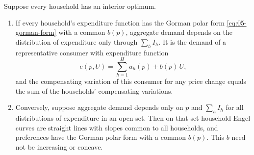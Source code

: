 \begin{proposition}\label{prop:05-gorman}
Suppose every household has an interior optimum.
\begin{enumerate}[label=(\roman*)]
  \item If every household's expenditure function has the Gorman polar form \eqref{eq:05-gorman-form}
  with a common $b(p)$, aggregate demand depends on the distribution of expenditure only through
  $\sum_h I_h$. It is the demand of a representative consumer with expenditure function
  \begin{equation}\label{eq:05-gorman-rep}
    e(p, U) = \sum_{h=1}^{H} a_h(p) + b(p)\, U ,
  \end{equation}
  and the compensating variation of this consumer for any price change equals the sum of the
  households' compensating variations.
  \item Conversely, suppose aggregate demand depends only on $p$ and $\sum_h I_h$ for all distributions
  of expenditure in an open set. Then on that set household Engel curves are straight lines with slopes
  common to all households, and preferences have the Gorman polar form with a common $b(p)$. This $b$
  need not be increasing or concave.
\end{enumerate}
\end{proposition}

